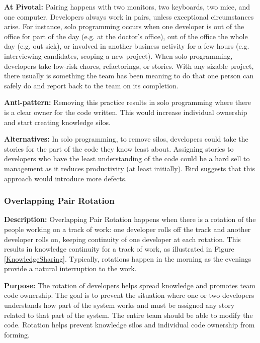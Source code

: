 \textbf{At Pivotal:} Pairing happens with two monitors, two keyboards, two mice, and one computer. Developers always work in pairs, unless exceptional circumstances arise. For instance, solo programming occurs when one developer is out of the office for part of the day (e.g. at the doctor's office), out of the office the whole day (e.g. out sick), or involved in another business activity for a few hours (e.g. interviewing candidates, scoping a new project). When solo programming, developers take low-risk chores, refactorings, or stories. With any sizable project, there usually is something the team has been meaning to do that one person can safely do and report back to the team on its completion. 

\textbf{Anti-pattern:} Removing this practice results in solo programming where there is a clear owner for the code written. This would increase individual ownership and start creating knowledge silos. 

\textbf{Alternatives:} In solo programming, to remove silos, developers could take the stories for the part of the code they know least about. Assigning stories to developers who have the least understanding of the code could be a hard sell to management as it reduces productivity (at least initially). Bird \cite{BirdDontTouchMyCode} suggests that this approach would introduce more defects. 

\subsubsection{Overlapping Pair Rotation}
\label{OverlappingPairRotationSection}
\textbf{Description:} Overlapping Pair Rotation happens when there is a rotation of the people working on a track of work: one developer rolls off the track and another developer rolls on, keeping continuity of one developer at each rotation. This results in knowledge continuity for a track of work, as illustrated in Figure \ref{KnowledgeSharing}. Typically, rotations happen in the morning as the evenings provide a natural interruption to the work. 

\textbf{Purpose:} The rotation of developers helps spread knowledge and promotes team code ownership. The goal is to prevent the situation where one or two developers understands how  part of the system works and must be assigned any story related to that part of the system. The entire team should be able to modify the code. Rotation helps prevent knowledge silos and individual code ownership from forming. 

